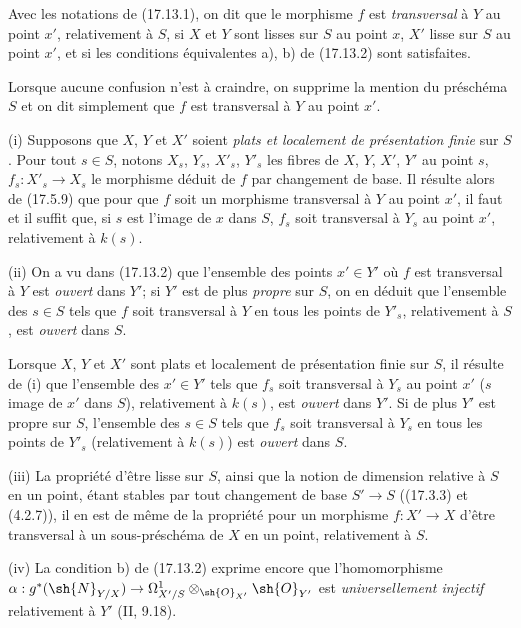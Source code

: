 \begin{definition}[17.13.3]
\label{IV.17.13.3}
Avec les notations de (17.13.1), on dit que le morphisme $f$ est \emph{transversal} à $Y$ au point $x'$, relativement à $S$, si $X$ et $Y$ sont lisses sur $S$ au point $x$, $X'$ lisse sur $S$ au point $x'$, et si les conditions équivalentes a), b) de (17.13.2) sont satisfaites.
\end{definition}

Lorsque aucune confusion n'est à craindre, on supprime la mention du préschéma $S$ et on dit simplement que $f$ est transversal à $Y$ au point $x'$.

\begin{remarks}[17.13.4]
\label{IV.17.13.4}
(i) Supposons que $X$, $Y$ et $X'$ soient \emph{plats et localement de présentation finie} sur $S$. Pour tout $s\in S$, notons $X_s$, $Y_s$, $X'_s$, $Y'_s$ les fibres de $X$, $Y$, $X'$, $Y'$ au point $s$, $f_s:X'_s\to X_s$ le morphisme déduit de $f$ par changement de base. Il résulte alors de (17.5.9) que pour que $f$ soit un morphisme transversal à $Y$ au point $x'$, il faut et il suffit que, si $s$ est l'image de $x$ dans $S$, $f_s$ soit transversal à $Y_s$ au point $x'$, relativement à $k(s)$.

(ii) On a vu dans (17.13.2) que l'ensemble des points $x'\in Y'$ où $f$ est transversal à $Y$ est \emph{ouvert} dans $Y'$; si $Y'$ est de plus \emph{propre} sur $S$, on en déduit que l'ensemble des $s\in S$ tels que $f$ soit transversal à $Y$ en tous les points de $Y'_s$, relativement à $S$, est \emph{ouvert} dans $S$.

Lorsque $X$, $Y$ et $X'$ sont plats et localement de présentation finie sur $S$, il résulte de (i) que l'ensemble des $x'\in Y'$ tels que $f_s$ soit transversal à $Y_s$ au point $x'$ ($s$ image de $x'$ dans $S$), relativement à $k(s)$, est \emph{ouvert} dans $Y'$. Si de plus $Y'$ est propre sur $S$, l'ensemble des $s\in S$ tels que $f_s$ soit transversal à $Y_s$ en tous les points de $Y'_s$ (relativement à $k(s)$) est \emph{ouvert} dans $S$.

(iii) La propriété d'être lisse sur $S$, ainsi que la notion de dimension relative à $S$ en un point, étant stables par tout changement de base $S'\to S$ ((17.3.3) et (4.2.7)), il en est de même de la propriété pour un morphisme $f:X'\to X$ d'être transversal à un sous-préschéma de $X$ en un point, relativement à $S$.


(iv) La condition b) de (17.13.2) exprime encore que l'homomorphisme $\alpha:g^*(\sh{N}_{Y/X})\to\Omega^1_{X'/S}\otimes_{\sh{O}_{X'}}\sh{O}_{Y'}$ est \emph{universellement injectif} relativement à $Y'$ (II, 9.18).
\end{remarks}

